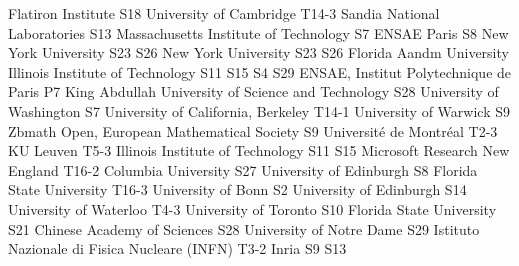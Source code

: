 \begin{multicols}{2}
{Flatiron Institute}
{S18}
{}
{}
{}
{}
{}
{}
{University of Cambridge}
{T14-3}
{}
{}
{}
{}
{}
{}
{Sandia National Laboratories}
{S13}
{}
{}
{}
{}
{}
{}
{Massachusetts Institute of Technology}
{S7}
{}
{}
{}
{}
{}
{}
{ENSAE Paris}
{S8}
{}
{}
{}
{}
{}
{}
{New York University}
{S23}
{S26}
{}
{}
{}
{}
{}
{New York University}
{S23}
{S26}
{}
{}
{}
{}
{}
{Florida Aandm University}
{}
{}
{}
{}
{}
{}
{}
{Illinois Institute of Technology}
{S11}
{S15}
{S4}
{S29}
{}
{}
{}
{ENSAE, Institut Polytechnique de Paris}
{P7}
{}
{}
{}
{}
{}
{}
{King Abdullah University of Science and Technology}
{S28}
{}
{}
{}
{}
{}
{}
{University of Washington}
{S7}
{}
{}
{}
{}
{}
{}
{University of California, Berkeley}
{T14-1}
{}
{}
{}
{}
{}
{}
{University of Warwick}
{S9}
{}
{}
{}
{}
{}
{}
{Zbmath Open, European Mathematical Society}
{S9}
{}
{}
{}
{}
{}
{}
{Université de Montréal}
{T2-3}
{}
{}
{}
{}
{}
{}
{KU Leuven}
{T5-3}
{}
{}
{}
{}
{}
{}
{Illinois Institute of Technology}
{S11}
{S15}
{}
{}
{}
{}
{}
{Microsoft Research New England}
{T16-2}
{}
{}
{}
{}
{}
{}
{Columbia University}
{S27}
{}
{}
{}
{}
{}
{}
{University of Edinburgh}
{S8}
{}
{}
{}
{}
{}
{}
{Florida State University}
{T16-3}
{}
{}
{}
{}
{}
{}
{University of Bonn}
{S2}
{}
{}
{}
{}
{}
{}
{University of Edinburgh}
{S14}
{}
{}
{}
{}
{}
{}
{University of Waterloo}
{T4-3}
{}
{}
{}
{}
{}
{}
{University of Toronto}
{S10}
{}
{}
{}
{}
{}
{}
{Florida State University}
{S21}
{}
{}
{}
{}
{}
{}
{Chinese Academy of Sciences}
{S28}
{}
{}
{}
{}
{}
{}
{University of Notre Dame}
{S29}
{}
{}
{}
{}
{}
{}
{Istituto Nazionale di Fisica Nucleare (INFN)}
{T3-2}
{}
{}
{}
{}
{}
{}
{Inria}
{S9}
{S13}
{}
{}
{}
{}
{}

\end{multicols}
